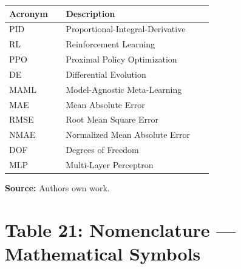 \documentclass[11pt,a4paper]{article}
\begin{document}
\begin{tabular}{@{}p{0.25\linewidth}p{0.65\linewidth}@{}}
\hline
\textbf{Acronym} & \textbf{Description} \\
\hline
PID & Proportional-Integral-Derivative \\
RL & Reinforcement Learning \\
PPO & Proximal Policy Optimization \\
DE & Differential Evolution \\
MAML & Model-Agnostic Meta-Learning \\
MAE & Mean Absolute Error \\
RMSE & Root Mean Square Error \\
NMAE & Normalized Mean Absolute Error \\
DOF & Degrees of Freedom \\
MLP & Multi-Layer Perceptron \\
\hline
\end{tabular}

\vspace{0.3cm}
\noindent
\textbf{Source:} Authors own work.


\section*{Table 21: Nomenclature --- Mathematical Symbols}
\end{document}
